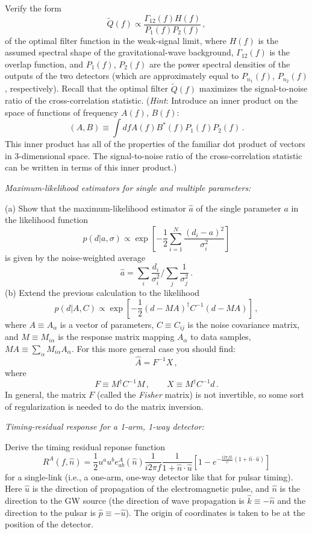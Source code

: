 \documentclass[11pt]{article}
\numberwithin{equation}{section}
\def\be{\begin{equation}}
\def\ee{\end{equation}}
\def\i{\item{}}
\begin{document}
Verify the form 
%
\be
\tilde Q(f)\propto \frac{\Gamma_{12}(f)H(f)}
{P_1(f)P_2(f)}\,,
\ee
of the optimal filter function in the weak-signal limit,
where $H(f)$ is the assumed spectral shape of the 
gravitational-wave background,
$\Gamma_{12}(f)$ is the overlap function, and $P_1(f)$, $P_2(f)$ 
are the power spectral densities of the outputs of the 
two detectors (which are approximately equal to 
$P_{n_1}(f)$, $P_{n_2}(f)$, respectively).
Recall that the optimal filter $\tilde Q(f)$ maximizes
the signal-to-noise ratio of the cross-correlation 
statistic.
({\em Hint}: Introduce an inner product on the space of
functions of frequency $A(f)$, $B(f)$:
%
\be
(A,B)\equiv\int df A(f) B^*(f) P_1(f) P_2(f)\,.
\ee
%
This inner product
has all of the properties of the familiar dot product
of vectors in 3-dimensional space.
The signal-to-noise ratio of the cross-correlation
statistic can be written in terms of this inner product.)

\i {\em Maximum-likelihood estimators for single and multiple
parameters:}
\label{exer:5}

(a) Show that the maximum-likelihood estimator $\hat a$ of 
the single parameter $a$ in the likelihood function
\be
p(d|a, \sigma) \propto
\exp\left[-\frac{1}{2}\sum_{i=1}^N \frac{(d_i-a)^2}{\sigma_i^2}\right]
\ee
%
is given by the noise-weighted average
%
\be
\hat a={\sum_i \frac{d_i}{\sigma_i^2}}\bigg/{\sum_j \frac{1}{\sigma_j^2}}\,.
\ee
%
(b) Extend the previous calculation to the likelihood
\be
p(d|A, C) \propto
\exp\left[-\frac{1}{2}(d-MA)^\dagger C^{-1} (d-MA)\right]\,,
\ee
%
where $A\equiv A_\alpha$ is a vector of parameters,
$C\equiv C_{ij}$ is the noise covariance matrix, and 
$M\equiv M_{i\alpha}$ is the response matrix mapping 
$A_\alpha$ to data samples, $MA\equiv \sum_\alpha M_{i\alpha}A_\alpha$.
For this more general case you should find:
%
\be
\hat A = F^{-1} X\,,
\ee
%
where
%
\be
F \equiv M^\dagger C^{-1} M\,,\qquad
X \equiv M^\dagger C^{-1} d\,.
\ee
%
In general, the matrix $F$ (called the {\em Fisher} matrix)
is not invertible, so some sort of regularization is needed
to do the matrix inversion.

\i {\em Timing-residual response for a 1-arm, 1-way detector:}
\label{exer:6}

Derive the timing residual reponse function
%
\be
R^A(f,\hat n) = 
\frac{1}{2}u^a u^b e^A_{ab}(\hat n)
\frac{1}{i2\pi f}
\frac{1}{1+\hat n\cdot \hat u}
\left[1-e^{-\frac{i2\pi fL}{c}(1+\hat n\cdot\hat u)}\right]
\ee
%
for a single-link (i.e., a one-arm, one-way detector like 
that for pulsar timing).
Here $\hat u$ is the direction of propagation of the
electromagnetic pulse, and $\hat n$ is the direction to the 
GW source (the direction of wave propagation is 
$\hat k\equiv -\hat n$ and the direction to the pulsar is
$\hat p\equiv -\hat u$).
The origin of coordinates is taken to be at the position 
of the detector.
\end{document}
